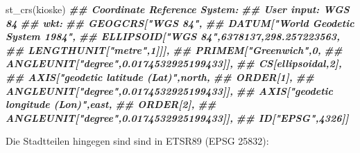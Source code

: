 \documentclass[
  ngerman,
]{article}
\newenvironment{Shaded}{\begin{snugshade}}{\end{snugshade}}
\newcommand{\DocumentationTok}[1]{\textcolor[rgb]{0.56,0.35,0.01}{\textbf{\textit{#1}}}}
\newcommand{\FunctionTok}[1]{\textcolor[rgb]{0.00,0.00,0.00}{#1}}
\newcommand{\NormalTok}[1]{#1}
\begin{document}
\begin{Shaded}
\begin{Highlighting}[]
\FunctionTok{st\_crs}\NormalTok{(kioske)}
\DocumentationTok{\#\# Coordinate Reference System:}
\DocumentationTok{\#\#   User input: WGS 84 }
\DocumentationTok{\#\#   wkt:}
\DocumentationTok{\#\# GEOGCRS["WGS 84",}
\DocumentationTok{\#\#     DATUM["World Geodetic System 1984",}
\DocumentationTok{\#\#         ELLIPSOID["WGS 84",6378137,298.257223563,}
\DocumentationTok{\#\#             LENGTHUNIT["metre",1]]],}
\DocumentationTok{\#\#     PRIMEM["Greenwich",0,}
\DocumentationTok{\#\#         ANGLEUNIT["degree",0.0174532925199433]],}
\DocumentationTok{\#\#     CS[ellipsoidal,2],}
\DocumentationTok{\#\#         AXIS["geodetic latitude (Lat)",north,}
\DocumentationTok{\#\#             ORDER[1],}
\DocumentationTok{\#\#             ANGLEUNIT["degree",0.0174532925199433]],}
\DocumentationTok{\#\#         AXIS["geodetic longitude (Lon)",east,}
\DocumentationTok{\#\#             ORDER[2],}
\DocumentationTok{\#\#             ANGLEUNIT["degree",0.0174532925199433]],}
\DocumentationTok{\#\#     ID["EPSG",4326]]}
\end{Highlighting}
\end{Shaded}

Die Stadtteilen hingegen sind sind in ETSR89 (EPSG 25832):
\end{document}
